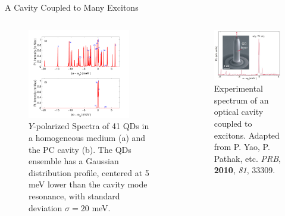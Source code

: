 \documentclass{beamer}
\begin{document}
\begin{frame}{A Cavity Coupled to Many Excitons}
\begin{columns}
\begin{figure}[htp]%
\centering
\begin{center}
\includegraphics[width=0.8\textwidth]{./Figs/QDspecPChom}
\end{center}
\caption[Spectra of 41 QDs in a homogeneous medium and a PC cavity.]{\fontsize{8}{-0.2}\selectfont $Y$-polarized Spectra of 41 QDs in a homogeneous medium (a) and the PC cavity (b). The QDs ensemble has a Gaussian distribution profile, centered at 5 meV lower than the cavity mode resonance, with standard deviation $\sigma=20$ meV.}
\label{QDspecPChom}
\end{figure}

\begin{figure}[htp]%
\centering
\begin{center}
\includegraphics[width=0.99\textwidth]{./Figs/ExperimentalSpec}
\end{center}
\caption[Spectra of a PC cavity in experiment.]{\fontsize{8}{-0.2}\selectfont Experimental spectrum of an optical cavity coupled to excitons. Adapted from P. Yao, P. Pathak, etc. \textit{PRB}, \textbf{2010}, \textit{81}, 33309. 
}
\label{specexp1}
\end{figure}


\end{columns}
\end{frame}
\end{document}
